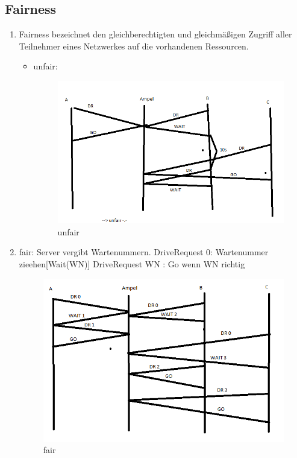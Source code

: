 \subsection{Fairness}
\begin{enumerate}
	\item Fairness bezeichnet den gleichberechtigten und gleichmäßigen Zugriff aller Teilnehmer eines Netzwerkes auf die vorhandenen Ressourcen.
	\begin{itemize}
		\item unfair:
		\begin{figure}[ht]
		\centering
		\includegraphics[width = 15cm]{./Rechnernetze/Images/8_2b.png}
		\caption{unfair}
		\label{img:unfair}
\end{figure}
\end{itemize}
		\item fair: Server vergibt Wartenummern. DriveRequest 0: Wartenummer zieehen[Wait(WN)] DriveRequest WN : Go wenn WN richtig
		\begin{figure}[ht]
		\centering
		\includegraphics[width = 15cm]{./Rechnernetze/Images/8_2b2.png}
		\caption{fair}
		\label{fair}
\end{figure}
\end{enumerate}
